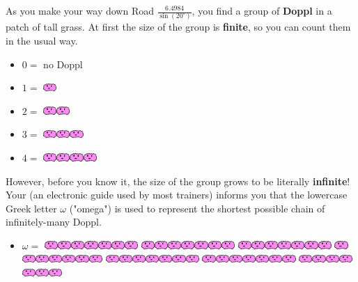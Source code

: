 

\newcommand{\mappDoppl}{\includegraphics[height=0.12in]{assets/doppl.pdf}}
\newcommand{\mappDopplOmega}{\includegraphics[height=0.12in]{assets/doppl-omega.pdf}}
\newcommand{\mappDopplOmegaSquared}{\includegraphics[height=0.12in]{assets/doppl-omega2.pdf}}

As you make your way down Road \(\frac{6.4984}{\sin(20^\circ)}\), you find a
group of \textbf{Doppl} \mappMobimon{} in a patch of tall grass.
At first the size of the group is \textbf{finite}, so you can count them
in the usual way.

\begin{itemize}
\item \(0=\) no Doppl

\item \(1=\) \mappDoppl

\item \(2=\) \mappDoppl\mappDoppl

\item \(3=\) \mappDoppl\mappDoppl\mappDoppl

\item \(4=\) \mappDoppl\mappDoppl\mappDoppl\mappDoppl
\end{itemize}

However, before you know it, the size of the group grows to
be literally \textbf{infinite}! Your \mappMobidex{} (an electronic
guide used by most trainers)
informs you that the lowercase Greek letter \(\omega\)
("omega") is used
to represent the shortest possible chain of infinitely-many Doppl.

\begin{itemize}
  \item \(\omega=\)
  \mappDoppl\mappDoppl\mappDoppl\mappDoppl\mappDoppl\mappDoppl\mappDoppl
  \mappDoppl\mappDoppl\mappDoppl\mappDoppl\mappDoppl\mappDoppl\mappDoppl
  \mappDoppl\mappDoppl\mappDoppl\mappDoppl\mappDoppl\mappDoppl\mappDoppl
  \mappDoppl\mappDoppl\mappDoppl\mappDoppl\mappDoppl\mappDoppl\mappDoppl
  \mappDoppl\mappDoppl\mappDoppl\mappDoppl\mappDoppl\mappDoppl\mappDoppl
  \mappDoppl\mappDoppl\mappDoppl\mappDoppl\mappDoppl\mappDoppl\mappDoppl
  \mappDoppl\mappDoppl\mappDoppl\mappDoppl\mappDoppl\mappDoppl\mappDoppl
\end{itemize}

